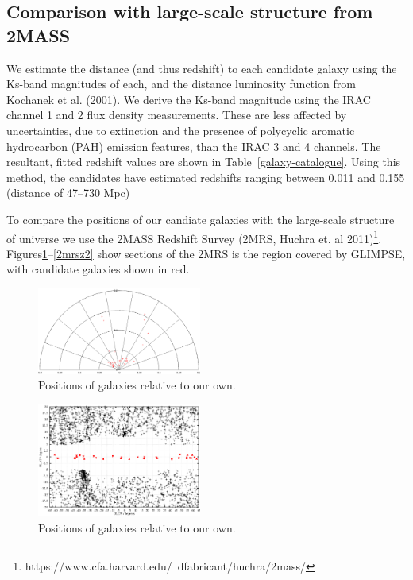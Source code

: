 \documentclass[times,usenatbib]{mn2e}
\begin{document}
\subsection{Comparison with large-scale structure from 2MASS}

We estimate the distance (and thus redshift) to each candidate galaxy using the Ks-band magnitudes of each, and the distance luminosity function from Kochanek et al. (2001). We derive the Ks-band magnitude using the IRAC channel 1 and 2 flux density measurements. These are less affected by uncertainties, due to extinction and the presence of polycyclic aromatic hydrocarbon (PAH) emission features, than the IRAC 3 and 4 channels. The resultant, fitted redshift values are shown in Table~\ref{galaxy-catalogue}. Using this method, the candidates have estimated redshifts ranging between 0.011 and 0.155 (distance of 47--730 Mpc)

To compare the positions of our candiate galaxies with the large-scale structure of universe we use the 2MASS Redshift Survey (2MRS, Huchra et. al 2011)\footnote{https://www.cfa.harvard.edu/~dfabricant/huchra/2mass/}. Figures\ref{polar}--\ref{2mrsz2} show sections of the 2MRS is the region covered by GLIMPSE, with candidate galaxies shown in red.

\begin{figure}
\includegraphics[width=0.48\textwidth]{./figures/polar.eps}
\caption{Positions of galaxies relative to our own.}
\label{polar}
\end{figure}

\begin{figure}
\includegraphics[width=0.48\textwidth]{./figures/2MRS_latlon.eps}
\caption{Positions of galaxies relative to our own.}
\label{2mrs}
\end{figure}
\end{document}
